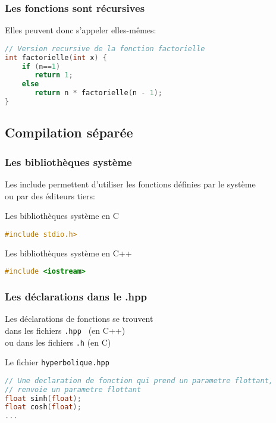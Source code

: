 \documentclass{beamer}
\begin{document}
\begin{frame}[fragile=singleslide,shrink=20]
\frametitle{Les fonctions sont récursives}
Elles peuvent donc s'appeler elles-mêmes:
\begin{lstlisting}[language=c++]
// Version recursive de la fonction factorielle
int factorielle(int x) {
    if (n==1) 
       return 1;
    else
       return n * factorielle(n - 1);
}
\end{lstlisting}
\end{frame}

\subsection{Compilation séparée}

\begin{frame}[fragile=singleslide,shrink=20]
\frametitle{Les bibliothèques système}
Les include permettent d'utiliser les fonctions définies par le système \\
ou par des éditeurs tiers:

\begin{block}{Les bibliothèques système en C}
\begin{lstlisting}[language=c++]
#include stdio.h>
\end{lstlisting}
\end{block}

\begin{block}{Les bibliothèques système en C++}
\begin{lstlisting}[language=c++]
#include <iostream>
\end{lstlisting}
\end{block}


\end{frame}

\begin{frame}[fragile=singleslide,shrink=20]
\frametitle{Les déclarations dans le .hpp}
Les déclarations de fonctions se trouvent  \\
dans les fichiers \texttt{.hpp } (en C++) \\
ou dans les fichiers \texttt{.h} (en C)

\begin{block}{Le fichier \texttt{hyperbolique.hpp}}
\begin{lstlisting}[language=c++]
// Une declaration de fonction qui prend un parametre flottant,
// renvoie un parametre flottant
float sinh(float);
float cosh(float);
...
\end{lstlisting}
\end{block}
\end{frame}
\end{document}
